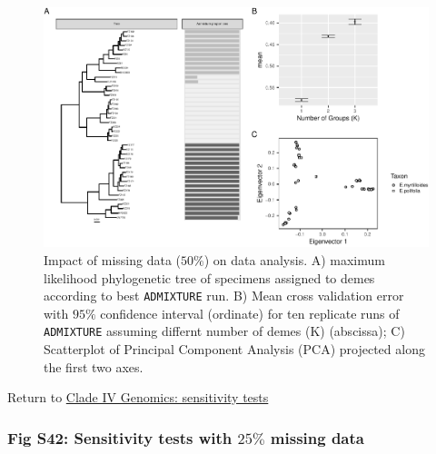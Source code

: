 \documentclass[
  11pt,
]{article}
\begin{document}
\begin{figure}
\includegraphics{Supplementary_Material_files/figure-latex/cladeIVgenomicSensitivityAnalysesMiddleplots-1} \caption{Impact of missing data ($50\%$) on data analysis. A) maximum likelihood phylogenetic tree of specimens assigned to demes according to best \texttt{ADMIXTURE} run. B) Mean cross validation error with $95\%$ confidence interval (ordinate) for ten replicate runs of \texttt{ADMIXTURE} assuming differnt number of demes (K) (abscissa); C) Scatterplot of Principal Component Analysis (PCA) projected along the first two axes.}\label{fig:cladeIVgenomicSensitivityAnalysesMiddleplots}
\end{figure}

Return to \protect\hyperlink{sensitivity-tests-3}{Clade IV Genomics: sensitivity tests}
\pagebreak

\hypertarget{fig-s42-sensitivity-tests-with-25-missing-data}{%
\subsubsection{\texorpdfstring{Fig S42: Sensitivity tests with \(25\%\) missing data}{Fig S42: Sensitivity tests with 25\textbackslash\% missing data}}\label{fig-s42-sensitivity-tests-with-25-missing-data}}
\end{document}
